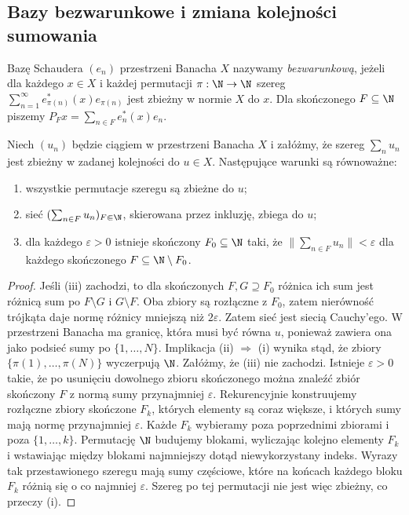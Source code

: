 \subsection{Bazy bezwarunkowe i zmiana kolejności sumowania}

\begin{definicja}
\label{def:unconditional27}
Bazę Schaudera $(e_n)$ przestrzeni Banacha $X$ nazywamy
\emph{bezwarunkową}, jeżeli dla każdego $x\in X$ i każdej
permutacji $\pi:\N\to\N$ szereg
$\sum_{n=1}^\infty e_{\pi(n)}^*(x)e_{\pi(n)}$
jest zbieżny w normie $X$ do $x$.
Dla skończonego $F\subseteq\N$ piszemy
$P_Fx=\sum_{n\in F}e_n^*(x)e_n$.
\end{definicja}

\begin{lemat}
\label{lem:net-unconditional27}
Niech $(u_n)$ będzie ciągiem w przestrzeni Banacha $X$
i załóżmy, że szereg $\sum_nu_n$ jest zbieżny w zadanej
kolejności do $u\in X$. Następujące warunki są równoważne:
\begin{enumerate}[label=\textup{(\roman*)}]
\item wszystkie permutacje szeregu są zbieżne do $u$;
\item sieć $(\sum_{n\in F}u_n)_{F\Subset\N}$, skierowana przez inkluzję,
 zbiega do $u$;
\item dla każdego $\varepsilon>0$ istnieje skończony $F_0\subseteq\N$
 taki, że $\|\sum_{n\in F}u_n\|<\varepsilon$
 dla każdego skończonego $F\subseteq\N\setminus F_0$.
\end{enumerate}
\end{lemat}
\begin{proof}
Jeśli (iii) zachodzi, to dla skończonych
$F,G\supseteq F_0$ różnica ich sum jest różnicą sum po
$F\setminus G$ i $G\setminus F$. Oba zbiory są rozłączne
z $F_0$, zatem nierówność trójkąta daje normę różnicy
mniejszą niż $2\varepsilon$. Zatem sieć jest
siecią Cauchy'ego. W przestrzeni Banacha ma granicę,
która musi być równa $u$, ponieważ zawiera ona jako podsieć
sumy po $\{1,\ldots,N\}$.
Implikacja (ii) $\Rightarrow$ (i) wynika stąd, że
zbiory $\{\pi(1),\ldots,\pi(N)\}$ wyczerpują $\N$.
Załóżmy, że (iii) nie zachodzi. Istnieje $\varepsilon>0$
takie, że po usunięciu dowolnego zbioru skończonego
można znaleźć zbiór skończony $F$ z normą sumy
przynajmniej $\varepsilon$. Rekurencyjnie konstruujemy
rozłączne zbiory skończone $F_k$, których elementy są coraz
większe, i których sumy mają normę przynajmniej $\varepsilon$.
Każde $F_k$ wybieramy poza poprzednimi zbiorami i poza
$\{1,\ldots,k\}$. Permutację $\N$ budujemy blokami,
wyliczając kolejno elementy $F_k$ i wstawiając
między blokami najmniejszy dotąd niewykorzystany indeks.
Wyrazy tak przestawionego szeregu mają sumy częściowe,
które na końcach każdego bloku $F_k$ różnią się o co najmniej
$\varepsilon$. Szereg po tej permutacji nie jest więc
zbieżny, co przeczy (i).
\end{proof}

